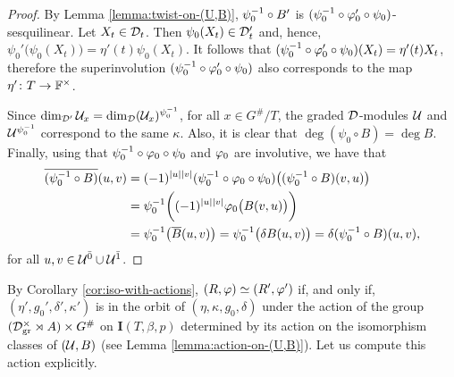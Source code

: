 \begin{proof}
	By Lemma \ref{lemma:twist-on-(U,B)}, $\psi_0^{-1} \circ B'$ is $(\psi_0^{-1} \circ \varphi_0' \circ \psi_0)$-sesquilinear.
	Let $X_t \in \mathcal{D}_t$.
	Then $\psi_0 (X_t)\in \mathcal{D}_t'$ and, hence, $\psi_0' \big(\psi_0 (X_t) \big) = \eta' (t) \psi_0 (X_t)$.
	It follows that $(\psi_0^{-1} \circ \varphi_0' \circ \psi_0) (X_t) = \eta'(t) X_t$, therefore the superinvolution $(\psi_0^{-1} \circ \varphi_0' \circ \psi_0)$ also corresponds to the map $\eta'\colon T \to \mathbb{F}^\times$.

	Since $\dim_{\mathcal{D}'} \mathcal U_x = \dim_{\mathcal{D}} (\mathcal U_x)^{\psi_0^{-1}}$, for all $x \in G^\#/T$, the graded $\mathcal{D}$-modules $\mathcal U$ and $\mathcal U^{\psi_0^{-1}}$ correspond to the same $\kappa$.
	Also, it is clear that $\deg (\psi_0 \circ B) = \deg B$. Finally, using that $\psi_0^{-1} \circ \varphi_0 \circ \psi_0$ and $\varphi_0$ are involutive, we have that
	\begin{align*}
		\overline{(\psi_0^{-1} \circ B)} (u,v) & = (-1)^{|u||v|} (\psi_0^{-1} \circ \varphi_0 \circ \psi_0) \big( (\psi_0^{-1} \circ B)(v, u) \big)                            \\
		                                      & = \psi_0^{-1} \bigg( (-1)^{|u||v|} \varphi_0 \big( B(v,u) \big) \bigg)                                                       \\
		                                      & = \psi_0^{-1} \big( \overline B (u,v) \big) = \psi_0^{-1} \big( \delta B (u,v) \big) = \delta (\psi_0^{-1} \circ B) (u,v),
	\end{align*}
	for all $u, v \in \mathcal U^{\bar0} \cup \mathcal U^{\bar1}$.
\end{proof}

By Corollary \ref{cor:iso-with-actions}, $(R, \varphi) \simeq (R', \varphi')$ if, and only if, $(\eta', g_0', \delta', \kappa')$ is in the orbit of $(\eta, \kappa, g_0, \delta)$ under the action of the group $(\mathcal{D}^\times_{\mathrm{gr}} \rtimes A ) \times G^\#$ on $\mathbf{I}(T, \beta, p)$ determined by its action on the isomorphism classes of $(\mathcal U, B)$ (see Lemma \ref{lemma:action-on-(U,B)}).
Let us compute this action explicitly.


